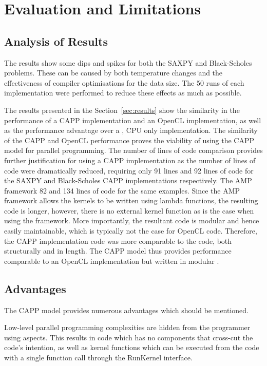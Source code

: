 \documentclass{sig-alternate-05-2015}
\begin{document}
\section{Evaluation and Limitations}\label{sec:evaluation}

\subsection{Analysis of Results}

The results show some dips and spikes for both the SAXPY and Black-Scholes
problems. These can be caused by both temperature changes and the effectiveness
of compiler optimisations for the data size. The 50 runs of each implementation
were performed to reduce these effects as much as possible.

The results presented in the Section~\ref{sec:results} show the similarity in
the performance of a CAPP implementation and an OpenCL implementation, as
well as the performance advantage over a \CPP, CPU only implementation. The
similarity of the CAPP and OpenCL performance proves the viability of
using the CAPP model for parallel programming. The number of lines of 
code comparison provides further justification for using a CAPP
implementation as the number of lines of \CPP code were dramatically
reduced, requiring only 91 lines and 92 lines of \CPP code for the SAXPY and
Black-Scholes CAPP implementations respectively. The \CPP AMP framework 82 and 134 lines of \CPP code for the
same examples. Since the \CPP AMP framework allows the kernels to be written using \CPP
lambda functions, the resulting \CPP code is longer, however, there is no external kernel function as is the
case when using the \CAPP framework.
More importantly, the resultant \CPP code is modular and hence easily maintainable, 
which is typically not the case for OpenCL code. Therefore,
the CAPP implementation code was more comparable to the \CPP code,
both structurally and in length. The CAPP model thus provides
performance comparable to an OpenCL implementation but written in modular \CPP.

\subsection{Advantages}

The CAPP model provides numerous advantages which should be mentioned.

Low-level parallel programming complexities are hidden from the programmer using aspects. 
This results in \CPP code which has no components that cross-cut the code's intention, as 
well as kernel functions which can be executed from the \CPP code with a single
function call through the RunKernel interface. 
\end{document}
